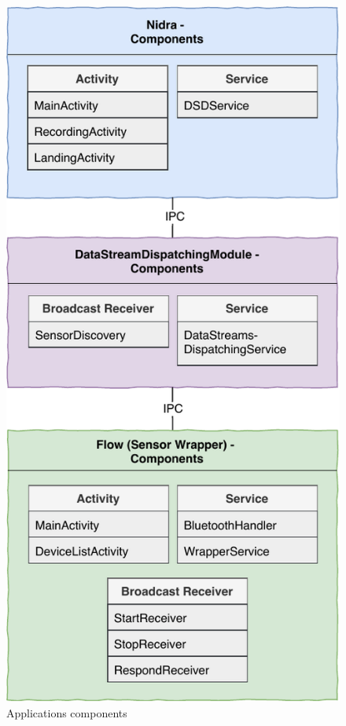 \begin{figure}
    \centering
    \includegraphics[scale=0.95]{images/Android_Components.pdf}
    \caption{Applications components}
    \label{fig:app_components}
\end{figure}


